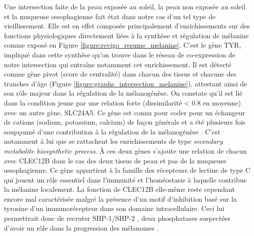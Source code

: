 Une intersection faite de la peau exposée au soleil, la peau non exposée au soleil et la muqueuse œsophagienne fait état dans notre cas d'un tel type de vieillissement. 
Elle est en effet composée principalement d'enrichissements sur des fonctions physiologiques directement liées à la synthèse et régulation de mélanine comme exposé en Figure \ref{figure:revigo_resume_melanine}.
C'est le gène TYR, impliqué dans cette synthèse qu'on trouve dans le réseau de co-expression de notre intersection qui entraîne notamment cet enrichissement. Il est détecté comme gène pivot (score de centralité) dans chacun des tissus et chacune des tranches d'âge (Figure \ref{figure:graphs_intersection_melanine}), attestant ainsi de son rôle majeur dans la régulation de la mélanogénèse. On constate qu'il est lié dans la condition jeune par une relation forte (dissimilarité < 0.8 en moyenne) avec un autre gène, SLC24A5. Ce gène est connu pour coder pour un échangeur de cations (sodium, potassium, calcium) de façon générale et a été plusieurs fois soupçonné d'une contribution à la régulation de la mélanogénèse . C'est notamment à lui que se rattachent les enrichissements de type \textit{secondary metabolite biosynthetic process}. 
À ces deux gènes s'ajoute une relation de chacun avec CLEC12B dans le cas des deux tissus de peau et pas de la muqueuse œsophagienne. Ce gène appartient à la famille des récepteurs de lectine de type C qui jouent un rôle essentiel dans l'immunité et l'homéostasie à laquelle contribue la mélanine localement. La fonction de CLEC12B elle-même reste cependant encore mal caractérisée malgré la présence d'un motif d'inhibition basé sur la tyrosine d'un immunorécepteur dans son domaine intracellulaire. Ceci lui permettrait donc de recruter SHP-1/SHP-2 , deux phosphatases suspectées d'avoir un rôle dans la progression des mélanomes . 

